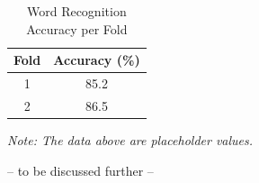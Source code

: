 \begin{table}[H]
    \centering
    \renewcommand{\arraystretch}{1.3}
    \setlength{\tabcolsep}{12pt}
    \caption{Word Recognition Accuracy per Fold}
    \label{tab:accuracy-results}
    \begin{tabular}{|c|c|}
        \hline
        \textbf{Fold} & \textbf{Accuracy (\%)} \\
        \hline
        1 & 85.2 \\
        2 & 86.5 \\
        \hline
    \end{tabular}
\end{table}

\textit{Note: The data above are placeholder values.}
\vspace{1em}

-- to be discussed further --
